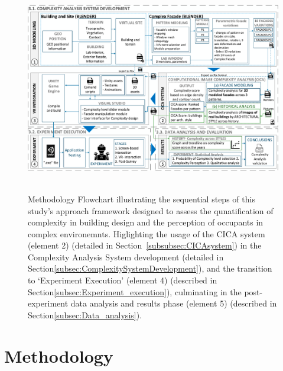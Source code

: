 \begin{linenumbers}
    \begin{figure}[!htb]
        \centering
        \includegraphics[width=\linewidth]{Images/MethodologyFlowchart}~\caption{Methodology Flowchart illustrating the sequential steps of this study's approach framework designed to assess the qunatification of complexity in building design and the perception of occupants in complex environemnts. Higlighting the usage of the CICA system (element 2) (detailed in Section~\ref{subsubsec:CICAsystem}) in the Complexity Analysis System development (detailed in Section\ref{subsec:ComplexitySystemDevelopment}), and the transition to `Experiment Execution' (element 4) (described in Section\ref{subsec:Experiment_execution}), culminating in the post-experiment data analysis and results phase (element 5) (described in Section\ref{subsec:Data_analysis}).}
          \label{fig:MethodologyFlowchartComplexity}
    \end{figure}


\section{Methodology}
\label{sec:Methodology}



\end{linenumbers}
